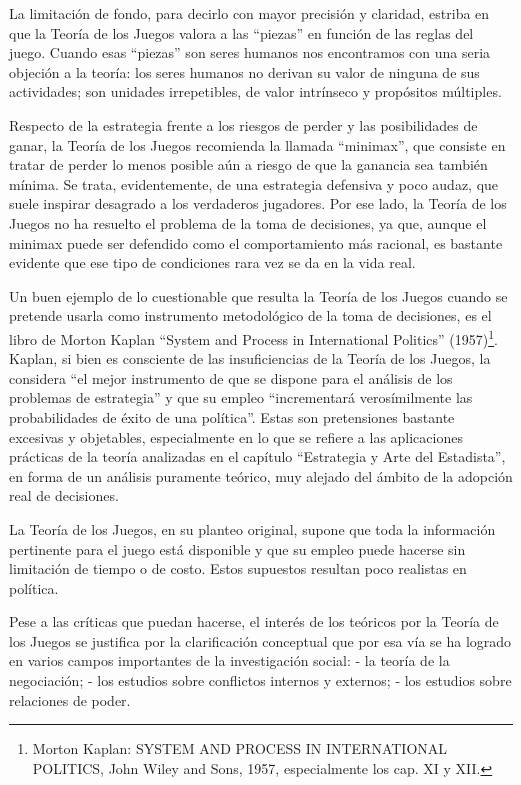 \documentclass[
]{book}
\begin{document}
La limitación de fondo, para decirlo con mayor precisión y claridad, estriba en que la Teoría de los Juegos valora a las ``piezas'' en función de las reglas del juego. Cuando esas ``piezas'' son seres humanos nos encontramos con una seria objeción a la teoría: los seres humanos no derivan su valor de ninguna de sus actividades; son unidades irrepetibles, de valor intrínseco y propósitos múltiples.

Respecto de la estrategia frente a los riesgos de perder y las posibilidades de ganar, la Teoría de los Juegos recomienda la llamada ``minimax'', que consiste en tratar de perder lo menos posible aún a riesgo de que la ganancia sea también mínima. Se trata, evidentemente, de una estrategia defensiva y poco audaz, que suele inspirar desagrado a los verdaderos jugadores. Por ese lado, la Teoría de los Juegos no ha resuelto el problema de la toma de decisiones, ya que, aunque el minimax puede ser defendido como el comportamiento más racional, es bastante evidente que ese tipo de condiciones rara vez se da en la vida real.

Un buen ejemplo de lo cuestionable que resulta la Teoría de los Juegos cuando se pretende usarla como instrumento metodológico de la toma de decisiones, es el libro de Morton Kaplan ``System and Process in International Politics'' (1957)\footnote{Morton Kaplan: SYSTEM AND PROCESS IN INTERNATIONAL POLITICS, John Wiley and Sons, 1957, especialmente los cap. XI y XII.}. Kaplan, si bien es consciente de las insuficiencias de la Teoría de los Juegos, la considera ``el mejor instrumento de que se dispone para el análisis de los problemas de estrategia'' y que su empleo ``incrementará verosímilmente las probabilidades de éxito de una política''. Estas son pretensiones bastante excesivas y objetables, especialmente en lo que se refiere a las aplicaciones prácticas de la teoría analizadas en el capítulo ``Estrategia y Arte del Estadista'', en forma de un análisis puramente teórico, muy alejado del ámbito de la adopción real de decisiones.

La Teoría de los Juegos, en su planteo original, supone que toda la información pertinente para el juego está disponible y que su empleo puede hacerse sin limitación de tiempo o de costo. Estos supuestos resultan poco realistas en política.

Pese a las críticas que puedan hacerse, el interés de los teóricos por la Teoría de los Juegos se justifica por la clarificación conceptual que por esa vía se ha logrado en varios campos importantes de la investigación social: - la teoría de la negociación; - los estudios sobre conflictos internos y externos; - los estudios sobre relaciones de poder.
\end{document}

